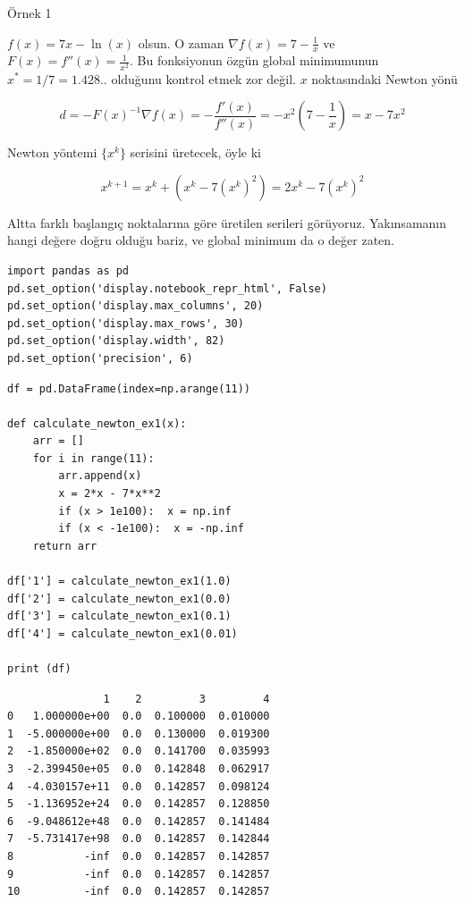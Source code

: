 \documentclass[12pt,fleqn]{article}\usepackage{../../common}
\begin{document}
Örnek 1

$f(x) = 7x - \ln(x)$ olsun. O zaman $\nabla f(x) = 7 - \frac{1}{x}$ ve
$F(x) = f''(x) = \frac{1}{x^2}$. Bu fonksiyonun özgün global minimumunun
$x^\ast  = 1/7 = 1.428..$ olduğunu kontrol etmek zor değil. $x$ noktasındaki
Newton yönü

$$
d = -F(x)^{-1} \nabla f(x) = -\frac{f'(x)}{f''(x)} = 
-x^2 \left( 7 - \frac{1}{x}  \right)=
x - 7x^2
$$

Newton yöntemi $\{ x^k \}$ serisini üretecek, öyle ki

$$
x^{k+1} = x^k + ( x^k - 7(x^k)^2  ) = 2x^k - 7(x^k)^2
$$

Altta farklı başlangıç noktalarına göre üretilen serileri
görüyoruz. Yakınsamanın hangi değere doğru olduğu bariz, ve global minimum
da o değer zaten. 

\begin{verbatim}
import pandas as pd
pd.set_option('display.notebook_repr_html', False)
pd.set_option('display.max_columns', 20)
pd.set_option('display.max_rows', 30) 
pd.set_option('display.width', 82) 
pd.set_option('precision', 6)
\end{verbatim}

\begin{verbatim}
df = pd.DataFrame(index=np.arange(11))

def calculate_newton_ex1(x):
    arr = []
    for i in range(11):
        arr.append(x)
        x = 2*x - 7*x**2
        if (x > 1e100):  x = np.inf
        if (x < -1e100):  x = -np.inf
    return arr

df['1'] = calculate_newton_ex1(1.0)
df['2'] = calculate_newton_ex1(0.0)
df['3'] = calculate_newton_ex1(0.1)
df['4'] = calculate_newton_ex1(0.01)

print (df)    
\end{verbatim}

\begin{verbatim}
               1    2         3         4
0   1.000000e+00  0.0  0.100000  0.010000
1  -5.000000e+00  0.0  0.130000  0.019300
2  -1.850000e+02  0.0  0.141700  0.035993
3  -2.399450e+05  0.0  0.142848  0.062917
4  -4.030157e+11  0.0  0.142857  0.098124
5  -1.136952e+24  0.0  0.142857  0.128850
6  -9.048612e+48  0.0  0.142857  0.141484
7  -5.731417e+98  0.0  0.142857  0.142844
8           -inf  0.0  0.142857  0.142857
9           -inf  0.0  0.142857  0.142857
10          -inf  0.0  0.142857  0.142857
\end{verbatim}
\end{document}
